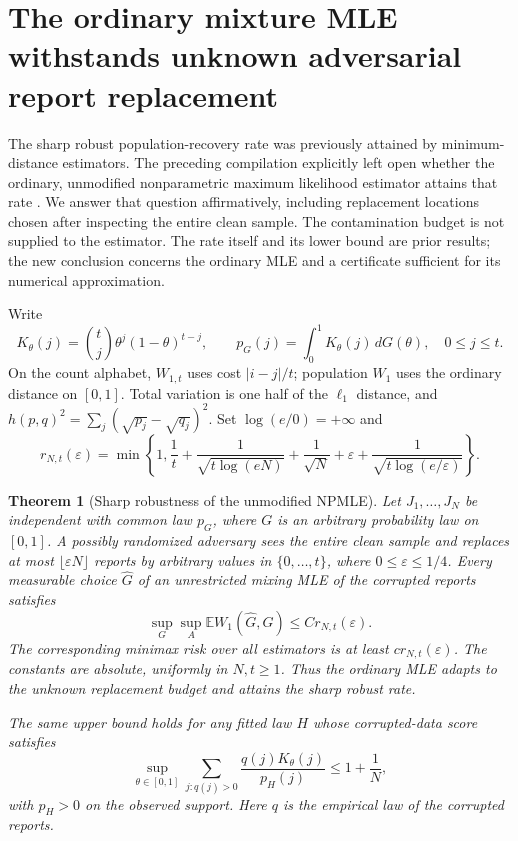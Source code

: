 \documentclass[11pt,a4paper]{article}
\newtheorem{theorem}{Theorem}[section]
\theoremstyle{definition}
\theoremstyle{remark}
\numberwithin{equation}{section}
\begin{document}
\section{The ordinary mixture MLE withstands unknown adversarial report replacement}
\label{p3:rt:sec}

The sharp robust population-recovery rate was previously attained by
minimum-distance estimators.  The preceding compilation explicitly left
open whether the ordinary, unmodified nonparametric maximum likelihood
estimator attains that rate \cite[Parts VII--VIII]{p3:RT_Compiled2026}.
We answer that question affirmatively, including replacement locations
chosen after inspecting the entire clean sample.  The contamination
budget is not supplied to the estimator.  The rate itself and its lower
bound are prior results; the new conclusion concerns the ordinary MLE
and a certificate sufficient for its numerical approximation.

Write
\[
 K_\theta(j)=\binom tj\theta^j(1-\theta)^{t-j},\qquad
 p_G(j)=\int_0^1K_\theta(j)\,dG(\theta),\quad 0\le j\le t.
\]
On the count alphabet, $W_{1,t}$ uses cost $|i-j|/t$; population
$W_1$ uses the ordinary distance on $[0,1]$.  Total variation is
one half of the $\ell_1$ distance, and
$h(p,q)^2=\sum_j(\sqrt{p_j}-\sqrt{q_j})^2$.
Set $\log(e/0)=+\infty$ and
\begin{equation}\label{p3:rt:rate}
 r_{N,t}(\varepsilon)=\min\left\{1,\frac1t+
 \frac1{\sqrt{t\log(eN)}}+\frac1{\sqrt N}
 +\varepsilon+\frac1{\sqrt{t\log(e/\varepsilon)}}\right\}.
\end{equation}

\begin{theorem}[Sharp robustness of the unmodified NPMLE]\label{p3:rt:main}
Let $J_1,\ldots,J_N$ be independent with common law $p_G$, where
$G$ is an arbitrary probability law on $[0,1]$.  A possibly randomized
adversary sees the entire clean sample and replaces at most
$\lfloor\varepsilon N\rfloor$ reports by arbitrary values in
$\{0,\ldots,t\}$, where $0\le\varepsilon\le1/4$.
Every measurable choice $\widehat G$ of an unrestricted mixing MLE
of the corrupted reports satisfies
\begin{equation}\label{p3:rt:upper}
 \sup_G\sup_A\mathbb E W_1(\widehat G,G)
                         \le C r_{N,t}(\varepsilon).
\end{equation}
The corresponding minimax risk over all estimators is at least
$c r_{N,t}(\varepsilon)$.  The constants are absolute, uniformly in
$N,t\ge1$.  Thus the ordinary MLE adapts to the unknown replacement
budget and attains the sharp robust rate.

The same upper bound holds for any fitted law $H$ whose corrupted-data
score satisfies
\begin{equation}\label{p3:rt:scorecert}
 \sup_{\theta\in[0,1]}
   \sum_{j:q(j)>0}\frac{q(j)K_\theta(j)}{p_H(j)}
                          \le1+\frac1N,
\end{equation}
with $p_H>0$ on the observed support.  Here $q$ is the empirical law
of the corrupted reports.
\end{theorem}
\end{document}
